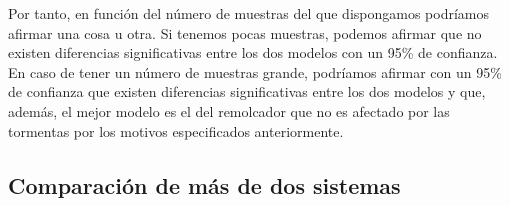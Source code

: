 \documentclass[11pt,a4paper]{article}
\begin{document}
Por tanto, en función del número de muestras del que dispongamos podríamos
afirmar una cosa u otra. Si tenemos pocas muestras, podemos afirmar que
no existen diferencias significativas entre los dos modelos con un 95\% de
confianza. En caso de tener un número de muestras grande, podríamos afirmar
con un 95\% de confianza que existen diferencias significativas entre los
dos modelos y que, además, el mejor modelo es el del remolcador que no es
afectado por las tormentas por los motivos especificados anteriormente.

\subsection{Comparación de más de dos sistemas}
\end{document}

